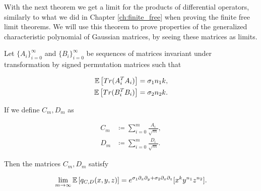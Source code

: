     With the next theorem we get a limit for the products of differential operators, similarly to what we did in Chapter \ref{ch:finite_free} when proving the finite free limit theorems. We will use this theorem to prove properties of the generalized characteristic polynomial of Gaussian matrices, by seeing these matrices as limits.

    \begin{theorem} \label{thm:exp_operator}
        Let $\{A_i\}_{i=0}^\infty$ and $\{B_i\}_{i=0}^\infty$ be sequences of matrices invariant under transformation by signed permutation matrices such that

        \begin{align*}
            \mathbb E \left[ Tr(A^T_iA_i) \right] &= \sigma_1 n_1 k,\\
            \mathbb E \left[ Tr(B^T_iB_i) \right] &= \sigma_2 n_2 k.
        \end{align*}

        If we define $C_m, D_m$ as

        \begin{align*}
            C_m &\coloneqq \sum_{i=0}^m \frac{A_i}{\sqrt m}, \\
            D_m &\coloneqq \sum_{i=0}^m \frac{D_i}{\sqrt m}.
        \end{align*}

        Then the matrices $C_m, D_m$ satisfy

        \begin{equation*}
            \lim_{m\to\infty} \mathbb E \left[ q_{C,D}(x,y,z) \right] = e^{\sigma_1 \partial_x \partial_y + \sigma_2 \partial_x \partial_z}[x^k y^{n_1} z^{n_2}].
        \end{equation*}
    \end{theorem}


